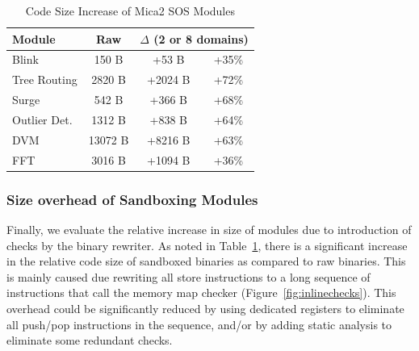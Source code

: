\begin{table}[htdp]
\centering
\small{\def\X{\hphantom{0}}\def\XX{\X\X}
\begin{tabular}{|l|c|c|c|}
	\hline
	Module & Raw & \multicolumn{2}{c|}{$\Delta$ (2 or 8 domains)} \\
	\hline
	Blink\raise1pt\hbox{\strut} & \XX{}150 B & \XX{}+53 B & +35\%\\
	Tree Routing & \X{}2820 B & +2024 B & +72\%\\
	Surge & \XX{}542 B & \X{}+366 B & +68\%\\
	Outlier Det. & \X{}1312 B & \X{}+838 B & +64\% \\
	DVM & 13072 B & +8216 B & +63\%\\
	FFT & \X{}3016 B & \X{}+1094 B & +36\% \\
	\hline
\end{tabular}}
\caption{Code Size Increase of Mica2 SOS Modules}
\label{tab:module_size_comparison}
\end{table}

\subsubsection{Size overhead of Sandboxing Modules}
%
Finally, we evaluate the relative increase in size of modules due to
introduction of checks by the binary rewriter.
%
As noted in Table~\ref{tab:module_size_comparison}, there is a significant
increase in the relative code size of sandboxed binaries as compared to raw
binaries.
%
This is mainly caused due rewriting all store instructions to a long
sequence of instructions that call the memory map checker
(Figure~\ref{fig:inlinechecks}).
% 
This overhead could be significantly reduced by using dedicated registers
to eliminate all push/pop instructions in the sequence, and/or by adding
static analysis to eliminate some redundant checks.
%
%
